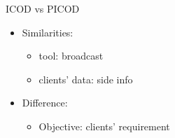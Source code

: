 \documentclass[xcolor=dvipsnames, aspectratio=169]{beamer}
\begin{document}
\begin{frame}{ICOD vs PICOD}

	\begin{itemize}
			\item<1->[]	Similarities: 
			\begin{itemize}
				\item <2->[]
				tool: broadcast
				\item<3->[]
				clients' data: side info
			\end{itemize}
			\item<4->[]	Difference: 
			\begin{itemize}
				\item <5->[]
				Objective: clients' requirement
			\end{itemize}
		\end{itemize}
	\end{frame}
\end{document}
